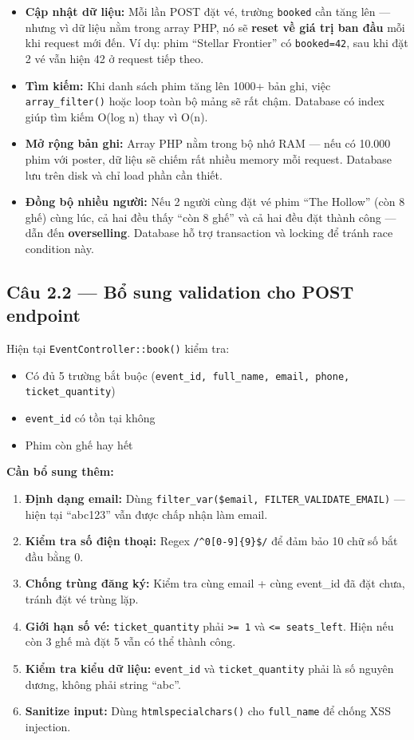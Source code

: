 \documentclass[12pt,a4paper]{article}
\begin{document}
\begin{itemize}
    \item \textbf{Cập nhật dữ liệu:} Mỗi lần POST đặt vé, trường \texttt{booked} cần tăng lên — nhưng vì dữ liệu nằm trong array PHP, nó sẽ \textbf{reset về giá trị ban đầu} mỗi khi request mới đến. Ví dụ: phim ``Stellar Frontier'' có \texttt{booked=42}, sau khi đặt 2 vé vẫn hiện 42 ở request tiếp theo.

    \item \textbf{Tìm kiếm:} Khi danh sách phim tăng lên 1000+ bản ghi, việc \texttt{array\_filter()} hoặc loop toàn bộ mảng sẽ rất chậm. Database có index giúp tìm kiếm O(log n) thay vì O(n).

    \item \textbf{Mở rộng bản ghi:} Array PHP nằm trong bộ nhớ RAM — nếu có 10.000 phim với poster, dữ liệu sẽ chiếm rất nhiều memory mỗi request. Database lưu trên disk và chỉ load phần cần thiết.

    \item \textbf{Đồng bộ nhiều người:} Nếu 2 người cùng đặt vé phim ``The Hollow'' (còn 8 ghế) cùng lúc, cả hai đều thấy ``còn 8 ghế'' và cả hai đều đặt thành công — dẫn đến \textbf{overselling}. Database hỗ trợ transaction và locking để tránh race condition này.
\end{itemize}

\subsection{Câu 2.2 — Bổ sung validation cho POST endpoint}

Hiện tại \texttt{EventController::book()} kiểm tra:
\begin{itemize}[noitemsep]
    \item Có đủ 5 trường bắt buộc (\texttt{event\_id, full\_name, email, phone, ticket\_quantity})
    \item \texttt{event\_id} có tồn tại không
    \item Phim còn ghế hay hết
\end{itemize}

\textbf{Cần bổ sung thêm:}
\begin{enumerate}[noitemsep]
    \item \textbf{Định dạng email:} Dùng \texttt{filter\_var(\$email, FILTER\_VALIDATE\_EMAIL)} — hiện tại ``abc123'' vẫn được chấp nhận làm email.
    \item \textbf{Kiểm tra số điện thoại:} Regex \texttt{/\^{}0[0-9]\{9\}\$/} để đảm bảo 10 chữ số bắt đầu bằng 0.
    \item \textbf{Chống trùng đăng ký:} Kiểm tra cùng email + cùng event\_id đã đặt chưa, tránh đặt vé trùng lặp.
    \item \textbf{Giới hạn số vé:} \texttt{ticket\_quantity} phải \texttt{>= 1} và \texttt{<= seats\_left}. Hiện nếu còn 3 ghế mà đặt 5 vẫn có thể thành công.
    \item \textbf{Kiểm tra kiểu dữ liệu:} \texttt{event\_id} và \texttt{ticket\_quantity} phải là số nguyên dương, không phải string ``abc''.
    \item \textbf{Sanitize input:} Dùng \texttt{htmlspecialchars()} cho \texttt{full\_name} để chống XSS injection.
\end{enumerate}
\end{document}
